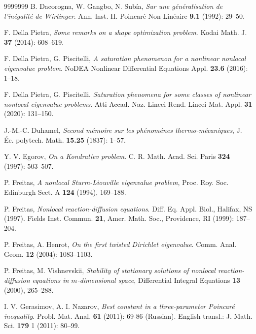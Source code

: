 \documentclass{amsart}
\theoremstyle{definition}
\theoremstyle{remark}
\begin{document}
\begin{thebibliography}{9999999}
 B. Dacorogna, W. Gangbo, N. Sub\'ia, \textit{Sur une g\'en\'eralisation de l'in\'egalit\'e de Wirtinger}.  Ann. lnst. H. Poincar\'e Non Lin\'eaire \textbf{9.1} (1992): 29--50.

 F. Della Pietra, \textit{Some remarks on a shape optimization problem}. Kodai Math. J. \textbf{37} (2014): 608--619.


 F. Della Pietra, G. Piscitelli, \textit{A saturation phenomenon for a nonlinear nonlocal eigenvalue problem}. NoDEA Nonlinear Differential Equations Appl. \textbf{23.6} (2016): 1--18.

 F. Della Pietra, G. Piscitelli. \textit{Saturation phenomena for some classes of nonlinear nonlocal eigenvalue problems}. Atti Accad. Naz. Lincei Rend. Lincei Mat. Appl. \textbf{31} (2020): 131--150.

 J.-M.-C. Duhamel, \textit{Second m\'{e}moire sur les ph\'{e}nom\'{e}nes thermo-m\'{e}caniques}, J. \'{E}c. polytech. Math. \textbf{15.25} (1837): 1--57.

 Y. V. Egorov, \textit{On a Kondratiev problem}. C. R. Math. Acad. Sci. Paris \textbf{324} (1997): 503--507.


 P. Freitas, \textit{A nonlocal Sturm-Liouville eigenvalue problem}, Proc. Roy. Soc. Edinburgh Sect. A {\bf 124} (1994), 169--188.

 P. Freitas, \textit{Nonlocal reaction-diffusion equations}. Diff. Eq. Appl. Biol., Halifax, NS (1997). Fields Inst. Commun. \textbf{21}, Amer. Math. Soc., Providence, RI (1999): 187--204.

 P. Freitas, A. Henrot, \textit{On the first twisted Dirichlet eigenvalue}. Comm. Anal. Geom. \textbf{12} (2004): 1083--1103.

 P. Freitas, M. Vishnevskii, \textit{Stability of stationary solutions of nonlocal reaction-diffusion equations in $m$-dimensional space}, Differential Integral Equations {\bf 13} (2000), 265--288.

 I. V. Gerasimov, A. I. Nazarov, \textit{Best constant in a three-parameter Poincar\'e inequality}. Probl. Mat. Anal.  \textbf{61} (2011): 69-86 (Russian). English transl.: J. Math. Sci. \textbf{179} 1 (2011): 80--99. 


\end{thebibliography}
\end{document}
